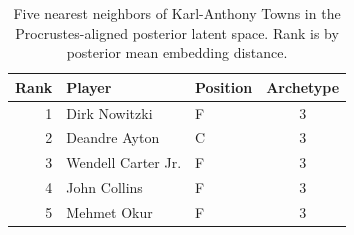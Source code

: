 \begin{table}[htbp]
  \centering\small
  \begin{tabular}{rllc}
    \toprule
    Rank & Player & Position & Archetype \\
    \midrule
    1 & Dirk Nowitzki & F & 3 \\
    2 & Deandre Ayton & C & 3 \\
    3 & Wendell Carter Jr. & F & 3 \\
    4 & John Collins & F & 3 \\
    5 & Mehmet Okur & F & 3 \\
    \bottomrule
  \end{tabular}
  \caption{Five nearest neighbors of Karl-Anthony Towns in the Procrustes-aligned posterior latent space. Rank is by posterior mean embedding distance.}
  \label{tab:Karl_Anthony_Towns_neighbors}
\end{table}

